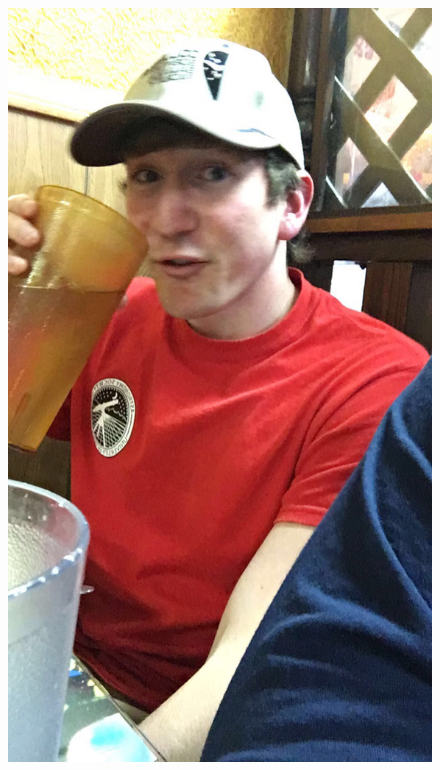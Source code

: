 \begin{figure}[h!]
  \begin{center}
      \includegraphics[width=\textwidth]{./figures/andrew_troll.jpg}
      \label{fig:duck}
  \end{center}
\end{figure}